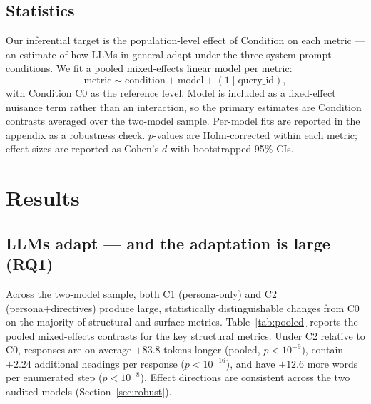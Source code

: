 \documentclass[11pt,letterpaper]{article}
\begin{document}
\subsection{Statistics}

Our inferential target is the population-level effect of Condition on each metric --- an estimate of how LLMs in general adapt under the three system-prompt conditions. We fit a pooled mixed-effects linear model per metric:
\[
\text{metric} \sim \text{condition} + \text{model} + (1 \mid \text{query\_id}),
\]
with Condition $\text{C0}$ as the reference level. Model is included as a fixed-effect nuisance term rather than an interaction, so the primary estimates are Condition contrasts averaged over the two-model sample. Per-model fits are reported in the appendix as a robustness check. $p$-values are Holm-corrected within each metric; effect sizes are reported as Cohen's $d$ with bootstrapped 95\% CIs.

\section{Results}

\subsection{LLMs adapt --- and the adaptation is large (RQ1)}

Across the two-model sample, both C1 (persona-only) and C2 (persona+directives) produce large, statistically distinguishable changes from C0 on the majority of structural and surface metrics. Table~\ref{tab:pooled} reports the pooled mixed-effects contrasts for the key structural metrics. Under C2 relative to C0, responses are on average $+83.8$ tokens longer (pooled, $p < 10^{-9}$), contain $+2.24$ additional headings per response ($p < 10^{-16}$), and have $+12.6$ more words per enumerated step ($p < 10^{-8}$). Effect directions are consistent across the two audited models (Section~\ref{sec:robust}).
\end{document}
